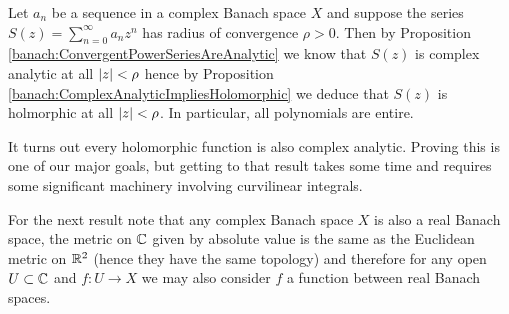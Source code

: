 \begin{examp}Let $a_n$ be a sequence in a complex Banach space $X$ and
  suppose the series
  $S(z) = \sum_{n=0}^\infty a_n z^n$ has radius of convergence $\rho>0$.
  Then by Proposition \ref{banach:ConvergentPowerSeriesAreAnalytic} we
  know that $S(z)$ is complex analytic at all $\left \vert z \right \vert < \rho$ hence by Proposition \ref{banach:ComplexAnalyticImpliesHolomorphic} we deduce that $S(z)$ is
  holmorphic at all $\left \vert z \right \vert < \rho$.   In particular, all polynomials are entire.
\end{examp}

It turns out every holomorphic function is also complex analytic.   Proving this is one of our major goals, but getting to that result takes some time and requires some significant machinery involving curvilinear integrals.

For the next result note that any complex Banach space $X$ is also a
real Banach space, the metric on $\mathbb{C}$ given by absolute value
is the same as the Euclidean metric on $\mathbb{R}^2$ (hence they have the
same topology) and therefore for any open $U \subset \mathbb{C}$ and $f : U
\to X$ we may also consider $f$ a function between real Banach spaces.

